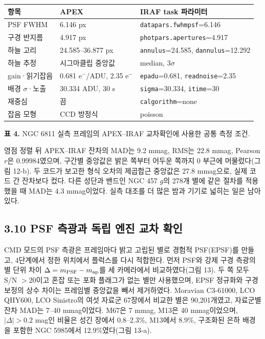 \begin{table}[!t]
\centering\small
\begin{tabularx}{\textwidth}{XXX}
\toprule
항목 & APEX & IRAF task 파라미터 \\
\midrule
PSF FWHM & 6.146 px & \texttt{datapars.fwhmpsf}=6.146 \\
구경 반지름 & 4.917 px & \texttt{photpars.apertures}=4.917 \\
하늘 고리 & 24.585–36.877 px & \texttt{annulus}=24.585, \texttt{dannulus}=12.292 \\
하늘 추정 & 시그마클립 중앙값 & median, $3\sigma$ \\
gain·읽기잡음 & 0.681 e$^-$/ADU, 2.35 e$^-$ & \texttt{epadu}=0.681, \texttt{readnoise}=2.35 \\
배경 $\sigma$·노출 & 30.334 ADU, 30 s & \texttt{sigma}=30.334, \texttt{itime}=30 \\
재중심 & 끔 & \texttt{calgorithm}=none \\
잡음 모형 & CCD 방정식 & poisson \\
\bottomrule
\end{tabularx}
\end{table}

\textbf{표 4.} NGC 6811 실측 프레임의 APEX–IRAF 교차확인에 사용한 공통 측정 조건.



영점 정렬 뒤 APEX–IRAF 잔차의 MAD는 9.2 mmag, RMS는 22.8 mmag, Pearson $r$은 0.99984였으며, 구간별 중앙값은 밝은 쪽부터 어두운 쪽까지 0 부근에 머물렀다(그림 12-b). 두 코드가 보고한 형식 오차의 제곱합근 중앙값은 27.8 mmag으로, 실제 코드 간 잔차보다 컸다. 다른 성단과 밴드인 NGC 457 $g$의 278개 별에 같은 절차를 적용했을 때 MAD는 4.3 mmag이었다. 실측 대조를 더 많은 밤과 기기로 넓히는 일은 남아 있다.



\subsection{3.10 PSF 측광과 독립 엔진 교차 확인}

CMD 모드의 PSF 측광은 프레임마다 밝고 고립된 별로 경험적 PSF(EPSF)를 만들고, 4단계에서 정한 위치에서 플럭스를 다시 적합한다. 먼저 PSF와 강제 구경 측광의 별 단위 차이 $\Delta=m_{\rm PSF}-m_{\rm ap}$를 세 카메라에서 비교하였다(그림 13). 두 쪽 모두 S/N $>20$이고 혼잡 또는 포화 플래그가 없는 별만 사용했으며, EPSF 정규화와 구경 보정의 상수 차이는 프레임별 중앙값을 빼서 제거하였다. Moravian C3-61000, LCO QHY600, LCO Sinistro의 여섯 자료군 67장에서 비교한 별은 90,201개였고, 자료군별 잔차 MAD는 7–40 mmag이었다. M67은 7 mmag, M13은 40 mmag이었으며, $|\Delta|>0.2$ mag인 비율은 성긴 장에서 0.8–2.3\%, M13에서 8.9\%, 구조화된 은하 배경을 포함한 NGC 5985에서 12.9\%였다(그림 13-a).




